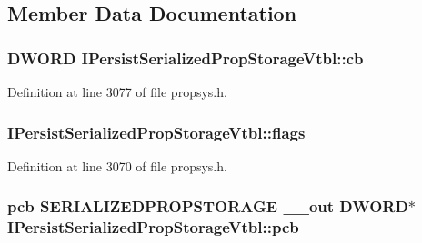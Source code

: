 \subsection{Member Data Documentation}
\subsubsection[{\texorpdfstring{cb}{cb}}]{ {\bf D\+W\+O\+RD} I\+Persist\+Serialized\+Prop\+Storage\+Vtbl\+::cb}\hypertarget{struct_i_persist_serialized_prop_storage_vtbl_ab316f88cbbf87f4e4737aef460bbf94e}{}\label{struct_i_persist_serialized_prop_storage_vtbl_ab316f88cbbf87f4e4737aef460bbf94e}


Definition at line 3077 of file propsys.\+h.

\subsubsection[{\texorpdfstring{flags}{flags}}]{ I\+Persist\+Serialized\+Prop\+Storage\+Vtbl\+::flags}\hypertarget{struct_i_persist_serialized_prop_storage_vtbl_a62dd2f900f31ca83f7e51f8cf6821ce9}{}\label{struct_i_persist_serialized_prop_storage_vtbl_a62dd2f900f31ca83f7e51f8cf6821ce9}


Definition at line 3070 of file propsys.\+h.

\subsubsection[{\texorpdfstring{pcb}{pcb}}]{ pcb {\bf S\+E\+R\+I\+A\+L\+I\+Z\+E\+D\+P\+R\+O\+P\+S\+T\+O\+R\+A\+GE} {\bf \+\_\+\+\_\+out} {\bf D\+W\+O\+RD}$\ast$ I\+Persist\+Serialized\+Prop\+Storage\+Vtbl\+::pcb}\hypertarget{struct_i_persist_serialized_prop_storage_vtbl_a0983d30093a69311488a4ead7e009eec}{}\label{struct_i_persist_serialized_prop_storage_vtbl_a0983d30093a69311488a4ead7e009eec}


